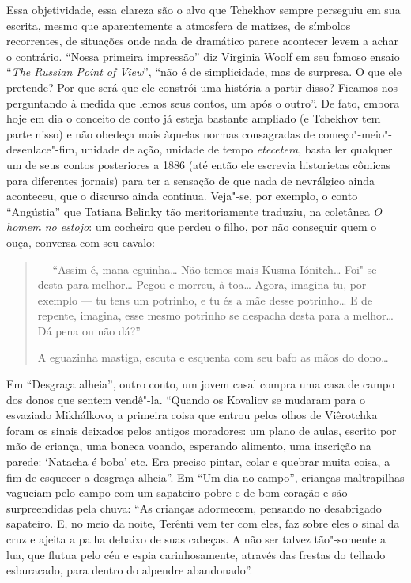 Essa objetividade, essa clareza são o alvo que Tchekhov sempre perseguiu
em sua escrita, mesmo que aparentemente a atmosfera de matizes, de
símbolos recorrentes, de situações onde nada de dramático parece
acontecer levem a achar o contrário. ``Nossa primeira impressão'' diz
Virginia Woolf em seu famoso ensaio ``\emph{The Russian Point of
View}'', ``não é de simplicidade, mas de surpresa. O que ele pretende? Por
que será que ele constrói uma história a partir disso? Ficamos nos
perguntando à medida que lemos seus contos, um após o outro''. De fato,
embora hoje em dia o conceito de conto já esteja bastante ampliado (e
Tchekhov tem parte nisso) e não obedeça mais àquelas normas consagradas
de começo"-meio"-desenlace"-fim, unidade de ação, unidade de tempo
\emph{etecetera}, basta ler qualquer um de seus contos posteriores a 1886 (até
então ele escrevia historietas cômicas para diferentes jornais) para ter
a sensação de que nada de nevrálgico ainda aconteceu, que o discurso
ainda continua. Veja"-se, por exemplo, o conto ``Angústia'' que Tatiana
Belinky tão meritoriamente traduziu, na coletânea \emph{O homem no
estojo}: um cocheiro que perdeu o filho, por não conseguir quem o ouça, conversa com seu cavalo:

\begin{quote}
--- ``Assim é, mana eguinha\ldots{} Não
temos mais Kusma Iónitch\ldots{} Foi"-se desta para melhor\ldots{} Pegou e morreu,
à toa\ldots{} Agora, imagina tu, por exemplo --- tu tens um potrinho, e tu és
a mãe desse potrinho\ldots{} E de repente, imagina, esse mesmo potrinho se
despacha desta para a melhor\ldots{} Dá pena ou não dá?''

A eguazinha mastiga, escuta e esquenta com seu bafo as mãos do dono\ldots{}
\end{quote}


Em ``Desgraça alheia'', outro conto, um jovem casal compra uma casa
de campo dos donos que sentem vendê"-la. ``Quando os Kovaliov se mudaram
para o esvaziado Mikhálkovo, a primeira coisa que entrou pelos olhos de
Viêrotchka foram os sinais deixados pelos antigos moradores: um plano de
aulas, escrito por mão de criança, uma boneca voando, esperando
alimento, uma inscrição na parede: `Natacha é boba' etc. Era preciso pintar, colar e quebrar muita coisa, a fim de esquecer a
desgraça alheia''. Em ``Um dia no campo'', crianças maltrapilhas
vagueiam pelo campo com um sapateiro pobre e de bom coração e são
surpreendidas pela chuva: ``As crianças adormecem, pensando no
desabrigado sapateiro. E, no meio da noite, Terênti vem ter com eles,
faz sobre eles o sinal da cruz e ajeita a palha debaixo de suas cabeças.
A não ser talvez tão"-somente a lua, que flutua pelo céu e espia
carinhosamente, através das frestas do telhado esburacado, para dentro
do alpendre abandonado''.

